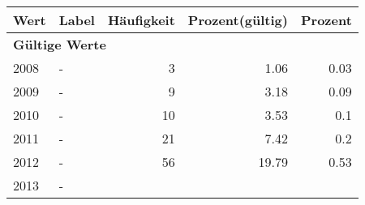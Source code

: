      \begin{longtable}{lXrrr}
     \toprule
     \textbf{Wert} & \textbf{Label} & \textbf{Häufigkeit} & \textbf{Prozent(gültig)} & \textbf{Prozent} \\
     \endhead
     \midrule
     \multicolumn{5}{l}{\textbf{Gültige Werte}}\\

     2008 &
     \multicolumn{1}{X}{ -  } &


       \num{3} &
       \num[round-mode=places,round-precision=2]{1.06} &
         \num[round-mode=places,round-precision=2]{0.03} \\

     2009 &
     \multicolumn{1}{X}{ -  } &


       \num{9} &
       \num[round-mode=places,round-precision=2]{3.18} &
         \num[round-mode=places,round-precision=2]{0.09} \\

     2010 &
     \multicolumn{1}{X}{ -  } &


       \num{10} &
       \num[round-mode=places,round-precision=2]{3.53} &
         \num[round-mode=places,round-precision=2]{0.1} \\

     2011 &
     \multicolumn{1}{X}{ -  } &


       \num{21} &
       \num[round-mode=places,round-precision=2]{7.42} &
         \num[round-mode=places,round-precision=2]{0.2} \\

     2012 &
     \multicolumn{1}{X}{ -  } &


       \num{56} &
       \num[round-mode=places,round-precision=2]{19.79} &
         \num[round-mode=places,round-precision=2]{0.53} \\

     2013 &
     \multicolumn{1}{X}{ -  } &



\end{longtable}
